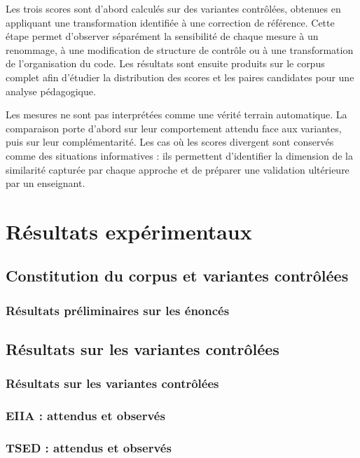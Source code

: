 Les trois scores sont d'abord calculés sur des variantes contrôlées, obtenues
en appliquant une transformation identifiée à une correction de référence.
Cette étape permet d'observer séparément la sensibilité de chaque mesure à un
renommage, à une modification de structure de contrôle ou à une transformation
de l'organisation du code. Les résultats sont ensuite produits sur le corpus
complet afin d'étudier la distribution des scores et les paires candidates
pour une analyse pédagogique.

Les mesures ne sont pas interprétées comme une vérité terrain automatique. La
comparaison porte d'abord sur leur comportement attendu face aux variantes,
puis sur leur complémentarité. Les cas où les scores divergent sont conservés
comme des situations informatives : ils permettent d'identifier la dimension
de la similarité capturée par chaque approche et de préparer une validation
ultérieure par un enseignant.


\chapter{Résultats expérimentaux}

\section{Constitution du corpus et variantes contrôlées }

\subsection{Résultats préliminaires sur les énoncés}


\section{Résultats sur les variantes contrôlées}

\subsection{Résultats sur les variantes contrôlées}
\subsection{EIIA : attendus et observés}
\subsection{TSED : attendus et observés}
